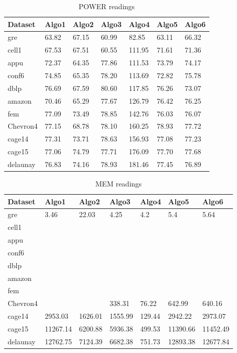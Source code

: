 \begin{table}[th]
\begin{center}
    \begin{tabular}{| l | l | l | l | l | l | l |}
    \hline
	Dataset & Algo1 & Algo2 & Algo3 & Algo4 & Algo5 & Algo6\\ \hline
	gre & 63.82 & 67.15 & 60.99 & 82.85 & 63.11 & 66.32 \\ \hline
	cell1 & 67.53 & 67.51 & 60.55 & 111.95 & 71.61 & 71.36\\ \hline
	appu & 72.37 & 64.35 & 77.86 & 111.53 & 73.79 & 74.17\\ \hline
	conf6 & 74.85 & 65.35 & 78.20 & 113.69 & 72.82 & 75.78\\ \hline
	dblp & 76.69 & 67.59 & 80.60 & 117.85 & 76.26 & 73.07\\ \hline
	amazon & 70.46 & 65.29 & 77.67 & 126.79 & 76.42 & 76.25\\ \hline
	fem & 77.09 & 73.49 & 78.85 & 142.76 & 76.03 & 76.07\\ \hline
	Chevron4 & 77.15 & 68.78 & 78.10 & 160.25 & 78.93 & 77.72\\ \hline
	cage14 & 77.31 & 73.71 & 78.63 & 156.93 & 77.08 & 77.23\\ \hline
	cage15 & 77.06 & 74.79 & 77.71 & 176.09 & 77.70 & 77.68\\ \hline
	delaunay & 76.83 & 74.16 & 78.93 & 181.46 & 77.45 & 76.89\\ \hline
    \hline
    \end{tabular}
\end{center}
\caption{\capfont POWER readings}
\label{tab:Table2}
\end{table}


\begin{table}[th]
\begin{center}
    \begin{tabular}{| l | l | l | l | l | l | l |}
    \hline
	Dataset & Algo1 & Algo2 & Algo3 & Algo4 & Algo5 & Algo6\\ \hline
	gre & 3.46 & 22.03 & 4.25 & 4.2 & 5.4 & 5.64 \\ \hline
	cell1 &  &  &  &  &  & \\ \hline
	appu &  &  &  &  &  & \\ \hline
	conf6 &  &  &  &  &  & \\ \hline
	dblp &  &  &  &  &  & \\ \hline
	amazon &  &  &  &  &  & \\ \hline
	fem &  &  &  &  &  & \\ \hline
	Chevron4 &  &  & 338.31 & 76.22 & 642.99 & 640.16\\ \hline
	cage14 & 2953.03 & 1626.01 & 1555.99 & 129.44 & 2942.22 & 2973.07\\ \hline
	cage15 & 11267.14 & 6200.88 & 5936.38 & 499.53 & 11390.66 & 11452.49\\ \hline
	delaunay & 12762.75 & 7124.39 & 6682.38 & 751.73 & 12893.38 & 12677.84\\ \hline
    \hline
    \end{tabular}
\end{center}
\caption{\capfont MEM readings}
\label{tab:Table3}
\end{table}


